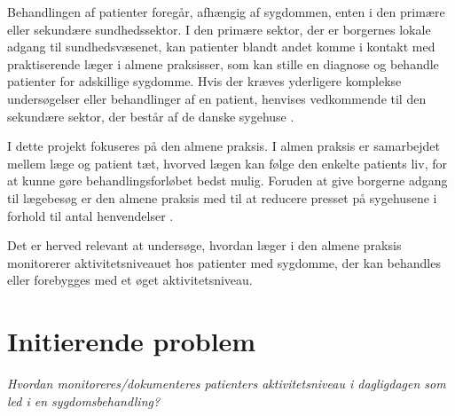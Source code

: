 Behandlingen af patienter foregår, afhængig af sygdommen, enten i den primære eller sekundære sundhedssektor. I den primære sektor, der er borgernes lokale adgang til sundhedsvæsenet, kan patienter blandt andet komme i kontakt med praktiserende læger i almene praksisser, som kan stille en diagnose og behandle patienter for adskillige sygdomme. Hvis der kræves yderligere komplekse undersøgelser eller behandlinger af en patient, henvises vedkommende til den sekundære sektor, der består af de danske sygehuse \citep{vedsted2014}. 

I dette projekt fokuseres på den almene praksis. I almen praksis er samarbejdet mellem læge og patient tæt, hvorved lægen kan følge den enkelte patients liv, for at kunne gøre behandlingsforløbet bedst mulig. Foruden at give borgerne adgang til lægebesøg er den almene praksis med til at reducere presset på sygehusene i forhold til antal henvendelser \citep{vedsted2014}.

Det er herved relevant at undersøge, hvordan læger i den almene praksis monitorerer aktivitetsniveauet hos patienter med sygdomme, der kan behandles eller forebygges med et øget aktivitetsniveau.  


\section{Initierende problem}
\textit{Hvordan monitoreres/dokumenteres patienters aktivitetsniveau i dagligdagen som led i en sygdomsbehandling?}  

